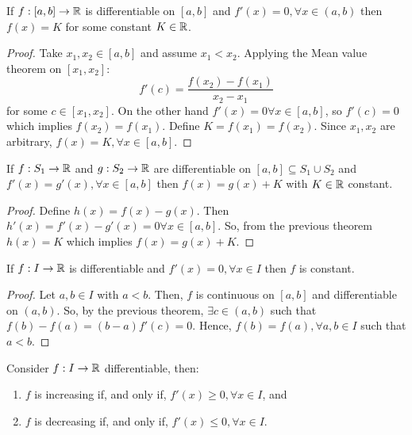 \begin{corollary}
    If $f: [a,b] \to \mathbb{R}$ is differentiable on $[a,b]$ and $f'(x) = 0, \forall x \in (a,b)$ then $f(x) = K$ for some constant $K \in \mathbb{R}$.
\end{corollary}

\begin{proof}
    Take $x_1, x_2 \in [a,b]$ and assume $x_1 < x_2$. Applying the Mean value theorem on $[x_1, x_2]$:
    \begin{equation*}
        f'(c) = \frac{f(x_2) - f(x_1)}{x_2 - x_1}
    \end{equation*}
    for some $c \in [x_1, x_2]$. On the other hand $f'(x) = 0 \forall x \in [a,b]$, so $f'(c) = 0$ which  implies $f(x_2) = f(x_1)$. Define $K = f(x_1) = f(x_2)$. Since $x_1, x_2$ are arbitrary, $f(x) = K, \forall x \in [a,b]$.
\end{proof}

\begin{corollary}
    If $f: S_1 \to \mathbb{R}$ and $g: S_2 \to \mathbb{R}$ are differentiable on $[a,b] \subseteq S_1 \cup S_2$ and $f'(x) = g'(x), \forall x \in [a,b]$ then $f(x) = g(x) + K$ with $K \in \mathbb{R}$ constant.
\end{corollary}

\begin{proof}
    Define $h(x) = f(x) - g(x)$. Then $h'(x) = f'(x) - g'(x) = 0 \forall x \in [a,b]$. So, from the previous theorem $h(x) = K$ which implies $f(x) = g(x) + K$.
\end{proof}

\begin{theorem}
    If $f: I \to \mathbb{R}$ is differentiable and $f'(x) = 0, \forall x \in I$ then $f$ is constant.
\end{theorem}

\begin{proof}
    Let $a,b \in I$ with $a < b$. Then, $f$ is continuous on $[a,b]$ and differentiable on $(a,b)$. So, by the previous theorem, $\exists c \in (a,b)$ such that $f(b) - f(a) = (b-a)f'(c) = 0$. Hence, $f(b) = f(a), \forall a, b \in I$ such that $a < b$.
\end{proof}

\begin{theorem}
    Consider $f: I \to \mathbb{R}$ differentiable, then:
    \begin{enumerate}
        \item $f$ is increasing if, and only if, $f'(x) \geq 0, \forall x \in I$, and
        \item $f$ is decreasing if, and only if, $f'(x) \leq 0, \forall x \in I$.
    \end{enumerate}
\end{theorem}

